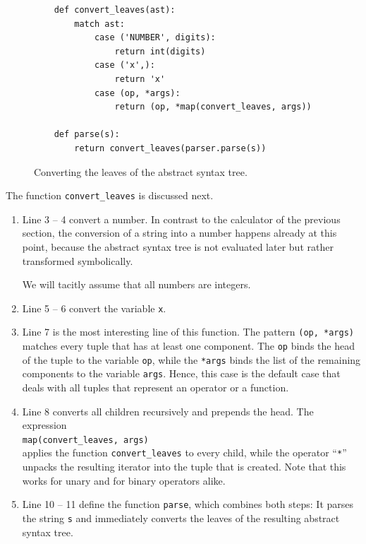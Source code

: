 \begin{figure}[!ht]
\centering
\begin{verbatim}
    def convert_leaves(ast):
        match ast:
            case ('NUMBER', digits):
                return int(digits)
            case ('x',):
                return 'x'
            case (op, *args):
                return (op, *map(convert_leaves, args))

    def parse(s):
        return convert_leaves(parser.parse(s))
\end{verbatim}
\vspace*{-0.3cm}
\caption{Converting the leaves of the abstract syntax tree.}
\label{fig:02-Differentiator.ipynb:ast}
\end{figure}

\noindent
The function \texttt{convert\_leaves} is discussed next.
\begin{enumerate}
\item Line 3 -- 4 convert a number.  In contrast to the calculator of the previous section, the conversion
      of a string into a number happens already at this point, because the abstract syntax tree is not
      evaluated later but rather transformed symbolically.

      We will tacitly assume that all numbers are integers.
\item Line 5 -- 6 convert the variable \texttt{x}.
\item Line 7 is the most interesting line of this function.  The pattern \texttt{(op, *args)} matches every
      tuple that has at least one component.  The  \texttt{op}
      binds the head of the tuple to the variable \texttt{op}, while the 
      \texttt{*args} binds the list of the remaining components to the variable \texttt{args}.  Hence, this
      case is the default case that deals with all tuples that represent an operator or a function.
\item Line 8 converts all children recursively and prepends the head.  The expression
      \\[0.2cm]
      \hspace*{1.3cm}
      \texttt{map(convert\_leaves, args)}
      \\[0.2cm]
      applies the function \texttt{convert\_leaves} to every child, while the operator ``\texttt{*}'' unpacks
      the resulting iterator into the tuple that is created.  Note that this works for unary and for binary
      operators alike.
\item Line 10 -- 11 define the function \texttt{parse}, which combines both steps:  It parses the string
      \texttt{s} and immediately converts the leaves of the resulting abstract syntax tree.
\end{enumerate}

